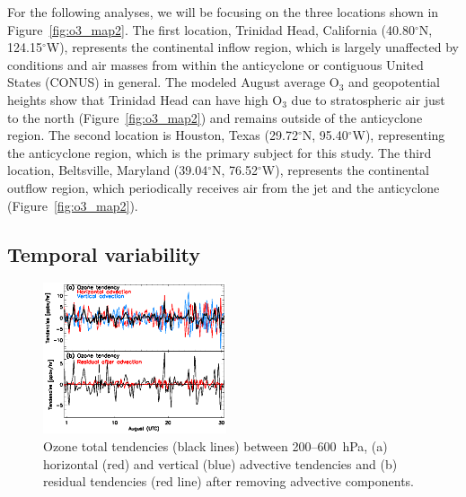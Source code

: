 For the following analyses, we will be focusing on the three locations shown in Figure~\ref{fig:o3_map2}.
The first location,  Trinidad Head, California (40.80$^\circ$N, 124.15$^\circ$W), represents the
continental inflow region, which is largely unaffected by conditions and air masses from within the
anticyclone or contiguous United States (CONUS) in general. The modeled August average O$_3$ and geopotential heights
show that Trinidad Head can have high O$_3$ due to stratospheric air just to the north
(Figure~\ref{fig:o3_map2}) and remains outside of the anticyclone region.
The second location is Houston, Texas (29.72$^\circ$N,
95.40$^\circ$W), representing the anticyclone region, which is the primary subject for this study.
The third location, Beltsville, Maryland (39.04$^\circ$N, 76.52$^\circ$W), represents
the continental outflow region, which periodically receives air from the jet and
the anticyclone (Figure~\ref{fig:o3_map2}).

\newpage\subsection{Temporal variability}

\begin{figure}
	\centering
	\begin{singlespacing}
	\vspace{-.3in}
	\includegraphics[width=0.48\textwidth]{Figures/tendency_res.eps}
	\caption[Ozone total, advective, and residual tendencies]{{\small
	Ozone total tendencies (black lines) between 200--600~hPa, (a) horizontal (red) and vertical (blue) advective tendencies and (b)
	residual tendencies (red line) after removing advective components.}}
	\label{fig:tend_res}
	\end{singlespacing}
\end{figure}

